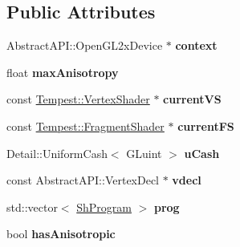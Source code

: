 \subsection*{Public Attributes}
\begin{DoxyCompactItemize}
\item 
\hypertarget{struct_g_l_s_l_1_1_data_a3d3d0643bb9186f8c704c1f15d0f3520}{Abstract\+A\+P\+I\+::\+Open\+G\+L2x\+Device $\ast$ {\bfseries context}}\label{struct_g_l_s_l_1_1_data_a3d3d0643bb9186f8c704c1f15d0f3520}

\item 
\hypertarget{struct_g_l_s_l_1_1_data_a6d182278d047775ec684f1a9d5f61d9c}{float {\bfseries max\+Anisotropy}}\label{struct_g_l_s_l_1_1_data_a6d182278d047775ec684f1a9d5f61d9c}

\item 
\hypertarget{struct_g_l_s_l_1_1_data_ab1a68c470e6dfeb00bee9a085d9aa53a}{const \hyperlink{class_tempest_1_1_vertex_shader}{Tempest\+::\+Vertex\+Shader} $\ast$ {\bfseries current\+V\+S}}\label{struct_g_l_s_l_1_1_data_ab1a68c470e6dfeb00bee9a085d9aa53a}

\item 
\hypertarget{struct_g_l_s_l_1_1_data_a736c5875b2acece914a0c3ecd8388647}{const \hyperlink{class_tempest_1_1_fragment_shader}{Tempest\+::\+Fragment\+Shader} $\ast$ {\bfseries current\+F\+S}}\label{struct_g_l_s_l_1_1_data_a736c5875b2acece914a0c3ecd8388647}

\item 
\hypertarget{struct_g_l_s_l_1_1_data_a6098de439c3d34a52c7e289f367bacb0}{Detail\+::\+Uniform\+Cash$<$ G\+Luint $>$ {\bfseries u\+Cash}}\label{struct_g_l_s_l_1_1_data_a6098de439c3d34a52c7e289f367bacb0}

\item 
\hypertarget{struct_g_l_s_l_1_1_data_af8530277458194ebbb63c2b269977afa}{const Abstract\+A\+P\+I\+::\+Vertex\+Decl $\ast$ {\bfseries vdecl}}\label{struct_g_l_s_l_1_1_data_af8530277458194ebbb63c2b269977afa}

\item 
\hypertarget{struct_g_l_s_l_1_1_data_aa25eb965f8fd8e32ef988dd13bf83d65}{std\+::vector$<$ \hyperlink{struct_g_l_s_l_1_1_data_1_1_sh_program}{Sh\+Program} $>$ {\bfseries prog}}\label{struct_g_l_s_l_1_1_data_aa25eb965f8fd8e32ef988dd13bf83d65}

\item 
\hypertarget{struct_g_l_s_l_1_1_data_a47ea72984a4bca598d8236cc788bbf61}{bool {\bfseries has\+Anisotropic}}\label{struct_g_l_s_l_1_1_data_a47ea72984a4bca598d8236cc788bbf61}


\end{DoxyCompactItemize}
